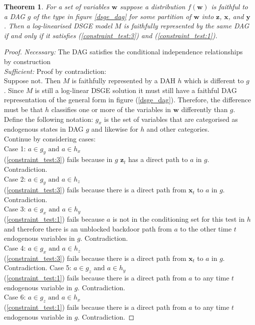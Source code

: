 \documentclass{article}
\newtheorem{theorem}{Theorem}
\begin{document}
\theoremstyle{definition}
\begin{theorem}
  For a set of variables $\mathbf{w}$ suppose a distribution $f(\mathbf{w})$ is faithful to a DAG $g$ of the type in figure \ref{dsge_dag} for some partition of $\mathbf{w}$ into $\mathbf{z}$, $\mathbf{x}$, and $\mathbf{y}$. Then a log-linearised DSGE model $M$ is faithfully represented by the same DAG if and only if it satisfies (\ref{constraint_test:3}) and (\ref{constraint_test:1}).
\end{theorem}
\begin{proof}
  \textit{Necessary:} The DAG satisfies the conditional independence relationships by construction \\
  \textit{Sufficient:} Proof by contradiction: \\
  Suppose not. Then $M$ is faithfully represented by a DAH $h$ which is different to $g$. Since $M$ is still a log-linear DSGE solution it must still have a faithful DAG representation of the general form in figure (\ref{dsge_dag}). Therefore, the difference must be that $h$ classifies one or more of the variables in $\mathbf{w}$ differently than $g$. Define the following notation: $g_x$ is the set of variables that are categorised as endogenous states in DAG  $g$ and likewise for $h$ and other categories. \\
  Continue by considering cases: \\
  Case 1: $a \in g_y \text{ and } a \in h_x$ \\
    (\ref{constraint_test:3}) fails because in $g$ $\mathbf{z}_t$ has a direct path to $a$ in $g$. Contradiction. \\
  Case 2: $a \in g_y \text{ and } a \in h_z$ \\
    (\ref{constraint_test:3}) fails because there is a direct path from $\mathbf{x}_t$ to $a$ in $g$. Contradiction. \\
  Case 3: $a \in g_x \text{ and } a \in h_y$ \\
    (\ref{constraint_test:1}) fails because $a$ is not in the conditioning set for this test in $h$ and therefore there is an unblocked backdoor path from $a$ to the other time $t$ endogenous variables in $g$. Contradiction. \\
  Case 4: $a \in g_x \text{ and } a \in h_z$ \\
    (\ref{constraint_test:3}) fails because there is a direct path from $\mathbf{x}_t$ to $a$ in $g$. Contradiction.
  Case 5: $a \in g_z \text{ and } a \in h_y$ \\
    (\ref{constraint_test:1}) fails because there is a direct path from $a$ to any time $t$ endogenous variable in $g$. Contradiction. \\
  Case 6: $a \in g_z \text{ and } a \in h_x$ \\
    (\ref{constraint_test:1}) fails because there is a direct path from $a$ to any time $t$ endogenous variable in $g$. Contradiction. 
\end{proof}
\end{document}
